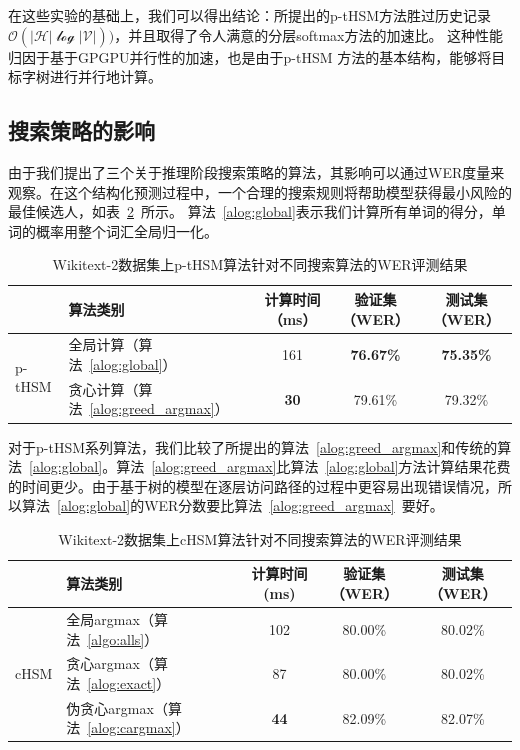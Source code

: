 在这些实验的基础上，我们可以得出结论：所提出的p-tHSM方法胜过历史记录$ \mathcal{O(| H | \log| V |)})$，并且取得了令人满意的分层softmax方法的加速比。 这种性能归因于基于GPGPU并行性的加速，也是由于p-tHSM 方法的基本结构，能够将目标字树进行并行地计算。


\subsection{搜索策略的影响}
由于我们提出了三个关于推理阶段搜索策略的算法，其影响可以通过WER度量来观察。在这个结构化预测过程中，一个合理的搜索规则将帮助模型获得最小风险的最佳候选人，如表~\ref{tab:search}~所示。 算法~\ref{alog:global}表示我们计算所有单词的得分，单词的概率用整个词汇全局归一化。
\begin{table}[!ht]
  \centering
  \caption{Wikitext-2数据集上p-tHSM算法针对不同搜索算法的WER评测结果\label{tab:psearch2}}
\begin{tabular}{llccc}
  \toprule
        & 算法类别&计算时间（ms）&验证集（WER）& 测试集（WER）\\ \midrule
  \multirow{2}{*}{p-tHSM}  &全局计算（算法~\ref{alog:global}）&161& \textbf{76.67\%}&\textbf{75.35\%}\\
        &贪心计算（算法~\ref{alog:greed_argmax}）&\textbf{30} & 79.61\%&79.32\%\\
  \bottomrule
\end{tabular}
\end{table}

对于p-tHSM系列算法，我们比较了所提出的算法~\ref{alog:greed_argmax}和传统的算法~\ref{alog:global}。算法~\ref{alog:greed_argmax}比算法~\ref{alog:global}方法计算结果花费的时间更少。由于基于树的模型在逐层访问路径的过程中更容易出现错误情况，所以算法~\ref{alog:global}的WER分数要比算法~\ref{alog:greed_argmax}~要好。
\begin{table}[!ht]
  \centering
  \caption{Wikitext-2数据集上cHSM算法针对不同搜索算法的WER评测结果\label{tab:search}}
\begin{tabular}{llccc}
  \toprule
   & 算法类别&计算时间 (ms)&验证集（WER）& 测试集（WER）\\ \midrule
  \multirow{3}{*}{cHSM} &全局argmax（算法~\ref{algo:alls}）&102& 80.00\%& 80.02\%\\
        &贪心argmax（算法~\ref{alog:exact}）&87& 80.00\%& 80.02\%\\
        &伪贪心argmax（算法~\ref{alog:cargmax}）&\textbf{44}& 82.09\%&  82.07\%\\
  \bottomrule
\end{tabular}
\end{table}


